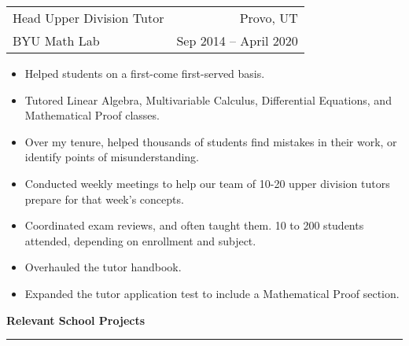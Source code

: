 \documentclass{article}
\newenvironment{compactItemize}{
  \begin{itemize}[itemsep=0ex, parsep=0ex, partopsep=0ex, topsep= -7pt]
}{
  \end{itemize}
}
\newcommand{\jobInfo}[4]{
  \begingroup
  \setlength{\tabcolsep}{0ex}
  \begin{tabularx}{\linewidth}{X r}
    #1 & %
    #2\\ %
    #3 & %
    #4   %
  \end{tabularx}%
  \endgroup%
}
\begin{document}
\jobInfo{Head Upper Division Tutor}{Provo, UT}{BYU Math Lab}{Sep 2014 -- April 2020}
\begin{compactItemize}
  \item Helped students on a first-come first-served basis.
  \item Tutored Linear Algebra, Multivariable Calculus, Differential Equations, and Mathematical Proof classes.
  \item Over my tenure, helped thousands of students find mistakes in their work, or identify points of misunderstanding.
  \item Conducted weekly meetings to help our team of 10-20 upper division tutors prepare for that week's concepts.
  \item Coordinated exam reviews, and often taught them.  10 to 200 students attended, depending on enrollment and subject.
  \item Overhauled the tutor handbook.
  \item Expanded the tutor application test to include a Mathematical Proof section.
\end{compactItemize}
\medskip
\textbf{Relevant School Projects %
}
\smallskip
\hrule
\end{document}
